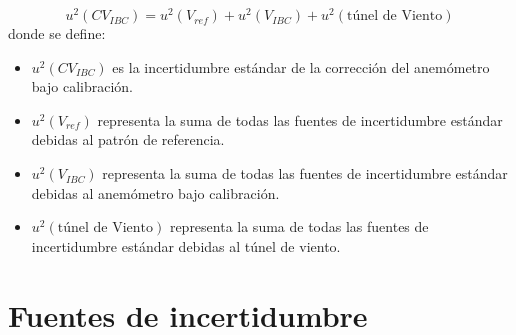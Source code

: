 \begin{equation}
    u^{2}(CV_{IBC}) = u^{2}(V_{ref})+u^{2}(V_{IBC})+u^{2}(\text{túnel de Viento})
    \label{eq:incertidumbreCombinada}
\end{equation}
donde se define:

\begin{itemize}
    \item $u^{2}(CV_{IBC})$ es la incertidumbre estándar de la corrección del anemómetro bajo calibración.
    \item $u^{2}(V_{ref})$ representa la suma de todas las fuentes de incertidumbre estándar debidas al patrón de referencia.
    \item $u^{2}(V_{IBC})$ representa la suma de todas las fuentes de incertidumbre estándar debidas al anemómetro bajo calibración.
    \item $u^{2}(\text{túnel de Viento})$ representa la suma de todas las fuentes de incertidumbre estándar debidas al túnel de viento.
\end{itemize}
\section{Fuentes de incertidumbre}\label{sec:fuentesDeIncertidumbre}
\newcommand{\descCalibracion}{Incertidumbre expandida especificada  en el certificado de calibración.}
\newcommand{\descAjusteCalibracion}{Desvío estándar del ajuste lineal con los datos discretos del certificado de calibración.}
\newcommand{\descResolucionInstrumento}{Mínima diferencia entre valores indicados por el instrumento bajo calibración a través de su sistema de adquisición o lectura de datos.}
\newcommand{\descResolucionPatron}{Solo se debe agregar en caso de utilizar un sistema de lectura o adquisición distinto al que fue calibrado.}
\newcommand{\descRepetibilidad}{Desvío estándar de la media aritmética de las mediciones.}
\newcommand{\descHisteresis}{Diferencia entre los valores de mediciones realizadas en los ciclos ascendente y descendente.}
\newcommand{\descFactorBloqueo}{Incertidumbre asociada al factor de bloqueo que se define como la relación entre el área transversal del túnel de viento y el área efectiva del anemómetro, proyectada en el plano transversal.}
\newcommand{\descHomogeneidad}{Variación espacial del flujo de aire dentro del túnel.}
\newcommand{\descAjusteHomogeneidad}{Desvío estándar del ajuste lineal con los datos discretos del certificado de homogeneidad.}
\newcommand{\descEstabilidad}{Variación temporal del flujo de aire dentro del túnel.}
\newcommand{\descAjusteEstabilidad}{Desvío estándar del ajuste lineal con los datos discretos del certificado de estabilidad.}
\newcommand{\descFactorCalib}{Incertidumbre asociada al factor de calibracion que proporciona la relación entre las condiciones en la posición de medición de referencia y las condiciones en la posición del IBC.}


